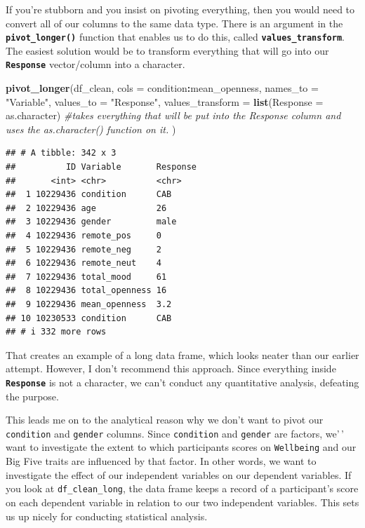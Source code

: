 \documentclass[
]{book}
\newenvironment{Shaded}{\begin{snugshade}}{\end{snugshade}}
\newcommand{\AttributeTok}[1]{\textcolor[rgb]{0.13,0.29,0.53}{#1}}
\newcommand{\CommentTok}[1]{\textcolor[rgb]{0.56,0.35,0.01}{\textit{#1}}}
\newcommand{\FunctionTok}[1]{\textcolor[rgb]{0.13,0.29,0.53}{\textbf{#1}}}
\newcommand{\NormalTok}[1]{#1}
\newcommand{\SpecialCharTok}[1]{\textcolor[rgb]{0.81,0.36,0.00}{\textbf{#1}}}
\newcommand{\StringTok}[1]{\textcolor[rgb]{0.31,0.60,0.02}{#1}}
\begin{document}
If you're stubborn and you insist on pivoting everything, then you would need to convert all of our columns to the same data type. There is an argument in the \textbf{\texttt{pivot\_longer()}} function that enables us to do this, called \textbf{\texttt{values\_transform}}. The easiest solution would be to transform everything that will go into our \textbf{\texttt{Response}} vector/column into a character.

\begin{Shaded}
\begin{Highlighting}[]
\FunctionTok{pivot\_longer}\NormalTok{(df\_clean,}
  \AttributeTok{cols =}\NormalTok{ condition}\SpecialCharTok{:}\NormalTok{mean\_openness, }
  \AttributeTok{names\_to =} \StringTok{"Variable"}\NormalTok{, }
  \AttributeTok{values\_to =} \StringTok{"Response"}\NormalTok{,}
  \AttributeTok{values\_transform =} \FunctionTok{list}\NormalTok{(}\AttributeTok{Response =}\NormalTok{ as.character) }\CommentTok{\#takes everything that will be put into the Response column and uses the \textasciigrave{}as.character()\textasciigrave{} function on it. }
\NormalTok{  )}
\end{Highlighting}
\end{Shaded}

\begin{verbatim}
## # A tibble: 342 x 3
##          ID Variable       Response
##       <int> <chr>          <chr>   
##  1 10229436 condition      CAB     
##  2 10229436 age            26      
##  3 10229436 gender         male    
##  4 10229436 remote_pos     0       
##  5 10229436 remote_neg     2       
##  6 10229436 remote_neut    4       
##  7 10229436 total_mood     61      
##  8 10229436 total_openness 16      
##  9 10229436 mean_openness  3.2     
## 10 10230533 condition      CAB     
## # i 332 more rows
\end{verbatim}

That creates an example of a long data frame, which looks neater than our earlier attempt. However, I don't recommend this approach. Since everything inside \textbf{\texttt{Response}} is not a character, we can't conduct any quantitative analysis, defeating the purpose.

This leads me on to the analytical reason why we don't want to pivot our \texttt{condition} and \texttt{gender} columns. Since \texttt{condition} and \texttt{gender} are factors, we'\,' want to investigate the extent to which participants scores on \texttt{Wellbeing} and our Big Five traits are influenced by that factor. In other words, we want to investigate the effect of our independent variables on our dependent variables. If you look at \texttt{df\_clean\_long}, the data frame keeps a record of a participant's score on each dependent variable in relation to our two independent variables. This sets us up nicely for conducting statistical analysis.
\end{document}
